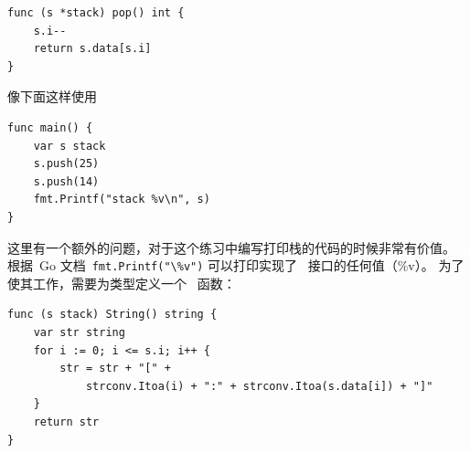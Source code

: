 \begin{Answer}
\begin{lstlisting}
func (s *stack) pop() int {
	s.i--
	return s.data[s.i]
}
\end{lstlisting}
像下面这样使用
\begin{lstlisting}
func main() {
	var s stack
	s.push(25)
	s.push(14)
	fmt.Printf("stack %v\n", s)
}
\end{lstlisting}

\Question 这里有一个额外的问题，对于这个练习中编写打印栈的代码的时候非常有价值。
根据~Go 文档~\lstinline{fmt.Printf("\%v")} 可以打印实现了~ 接口的任何值（\%v）。
为了使其工作，需要为类型定义一个~ 函数：
\begin{lstlisting}[caption=stack.String()]
func (s stack) String() string {
	var str string
	for i := 0; i <= s.i; i++ {
		str = str + "[" +
			strconv.Itoa(i) + ":" + strconv.Itoa(s.data[i]) + "]"
	}
	return str
}
\end{lstlisting}
\end{Answer}
